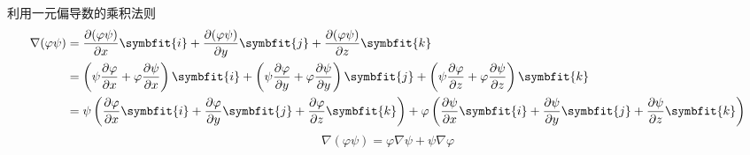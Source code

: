 \begin{myproof}
    利用一元偏导数的乘积法则
    \begin{equation}
        \begin{aligned}
            \nabla(\varphi \psi) & = \frac{\partial (\varphi \psi)}{\partial x} \symbfit{i} + \frac{\partial (\varphi \psi)}{\partial y} \symbfit{j} + \frac{\partial (\varphi \psi)}{\partial z} \symbfit{k}                                                                                                                                                                         \\
                                 & = \left( \psi \frac{\partial \varphi}{\partial x} + \varphi \frac{\partial \psi}{\partial x} \right) \symbfit{i} + \left( \psi \frac{\partial \varphi}{\partial y} + \varphi \frac{\partial \psi}{\partial y} \right) \symbfit{j} + \left( \psi \frac{\partial \varphi}{\partial z} + \varphi \frac{\partial \psi}{\partial z} \right) \symbfit{k} \\
                                 & = \psi \left( \frac{\partial \varphi}{\partial x} \symbfit{i} + \frac{\partial \varphi}{\partial y} \symbfit{j} + \frac{\partial \varphi}{\partial z} \symbfit{k} \right) + \varphi \left( \frac{\partial \psi}{\partial x} \symbfit{i} + \frac{\partial \psi}{\partial y} \symbfit{j} + \frac{\partial \psi}{\partial z} \symbfit{k} \right)
        \end{aligned}
    \end{equation}
    \begin{equation}
        \boxed{\nabla(\varphi \psi) = \varphi \nabla \psi + \psi \nabla \varphi}
    \end{equation}



\end{myproof}
